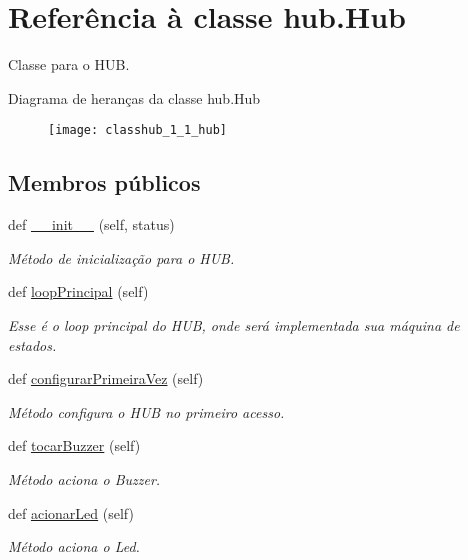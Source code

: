 \hypertarget{classhub_1_1_hub}{}\section{Referência à classe hub.\+Hub}
\label{classhub_1_1_hub}


Classe para o H\+UB.  


Diagrama de heranças da classe hub.\+Hub\begin{figure}[H]
\begin{center}
\leavevmode
\texttt{[image: classhub\_1\_1\_hub]}
\end{center}
\end{figure}
\subsection*{Membros públicos}
\begin{DoxyCompactItemize}
\item 
def \hyperlink{classhub_1_1_hub_a6927b78580ea47e1525a945e7d1da004}{\+\_\+\+\_\+init\+\_\+\+\_\+} (self, status)
\begin{DoxyCompactList}\small\item\em Método de inicialização para o H\+UB. \end{DoxyCompactList}\item 
def \hyperlink{classhub_1_1_hub_a27a1a63e552a3cf6a6229e655ef4e368}{loop\+Principal} (self)
\begin{DoxyCompactList}\small\item\em Esse é o loop principal do H\+UB, onde será implementada sua máquina de estados. \end{DoxyCompactList}\item 
def \hyperlink{classhub_1_1_hub_a32160e972d5ac2c695a3e86816113b95}{configurar\+Primeira\+Vez} (self)
\begin{DoxyCompactList}\small\item\em Método configura o H\+UB no primeiro acesso. \end{DoxyCompactList}\item 
def \hyperlink{classhub_1_1_hub_a9b81ca32890f6df8dece0e1ae497ee20}{tocar\+Buzzer} (self)
\begin{DoxyCompactList}\small\item\em Método aciona o Buzzer. \end{DoxyCompactList}\item 
def \hyperlink{classhub_1_1_hub_ac549b975878cf88b96dfbc57c319193e}{acionar\+Led} (self)
\begin{DoxyCompactList}\small\item\em Método aciona o Led. \end{DoxyCompactList}\end{DoxyCompactItemize}

